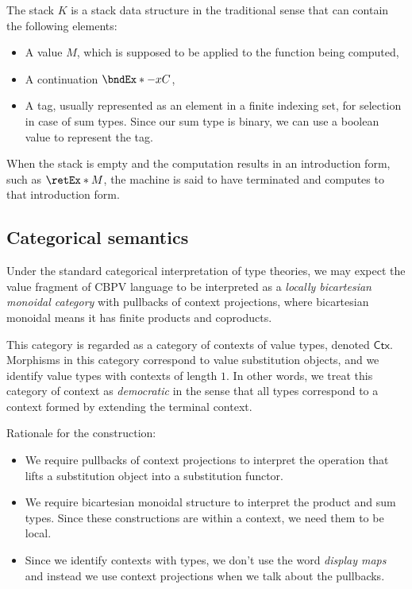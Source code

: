 \documentclass[letterpaper]{article}
\begin{document}
The stack $K$ is a stack data structure in the traditional sense that can contain the following elements:
\begin{itemize}
\item A value $M$, which is supposed to be applied to the function being computed,
\item A continuation $\bndEx*{-}{x}{C}$,
\item A tag, usually represented as an element in a finite indexing set, for selection in case of sum types.
  Since our sum type is binary, we can use a boolean value to represent the tag.
\end{itemize}
When the stack is empty and the computation results in an introduction form, such as $\retEx* M$,
the machine is said to have terminated and computes to that introduction form.

\subsection{Categorical semantics}
\newcommand{\Ctx}{\mathsf{Ctx}}
\newcommand{\Stk}{\mathsf{Stk}}

Under the standard categorical interpretation of type theories,
we may expect the value fragment of CBPV language to be interpreted as a
\emph{locally bicartesian monoidal category} with pullbacks of context projections,
where bicartesian monoidal means it has finite products and coproducts.

This category is regarded as a category of contexts of value types, denoted $\Ctx$.
Morphisms in this category correspond to value substitution objects,
and we identify value types with contexts of length $1$.
In other words, we treat this category of context as \emph{democratic}
in the sense that all types correspond to a context formed by extending the terminal context.

Rationale for the construction:
\begin{itemize}
\item We require pullbacks of context projections to interpret the operation that lifts a substitution object into a substitution functor.
\item We require bicartesian monoidal structure to interpret the product and sum types.
  Since these constructions are within a context, we need them to be local.
\item Since we identify contexts with types, we don't use the word \emph{display maps}
  and instead we use context projections when we talk about the pullbacks.
\end{itemize}
\end{document}
